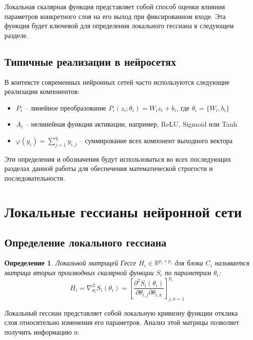 \documentclass[a4paper,12pt]{article}
\newtheorem{definition}{Определение}
\begin{document}
Локальная скалярная функция представляет собой способ оценки влияния параметров конкретного слоя на его выход
при фиксированном входе. Эта функция будет ключевой для определения локального гессиана в следующем разделе.

\subsection{Типичные реализации в нейросетях}

В контексте современных нейронных сетей часто используются следующие реализации компонентов:
\begin{itemize}
  \item $P_i$ -- линейное преобразование $P_i(z_i; \theta_i) = W_i z_i + b_i$, где $\theta_i = \{W_i, b_i\}$
  \item $A_i$ -- нелинейная функция активации, например, ReLU, Sigmoid или Tanh
  \item $\varphi(y_i) = \sum_{j=1}^{q_i} y_{i,j}$ -- суммирование всех компонент выходного вектора
\end{itemize}

Эти определения и обозначения будут использоваться во всех последующих разделах данной работы для обеспечения
математической строгости и последовательности.

\section{Локальные гессианы нейронной сети}

\subsection{Определение локального гессиана}

\begin{definition}
  Локальной матрицей Гессе $H_i \in \mathbb{R}^{p_i \times p_i}$ для блока $C_i$ называется матрица вторых
  производных скалярной функции $S_i$ по параметрам $\theta_i$:
  \begin{equation}
    H_i = \nabla_{\theta_i}^2 S_i(\theta_i) = \left[ \frac{\partial^2 S_i(\theta_i)}{\partial \theta_{i,j}
    \partial \theta_{i,k}} \right]_{j,k=1}^{p_i}
  \end{equation}
\end{definition}

Локальный гессиан представляет собой локальную кривизну функции отклика слоя относительно изменения его
параметров. Анализ этой матрицы позволяет получить информацию о:
\end{document}
